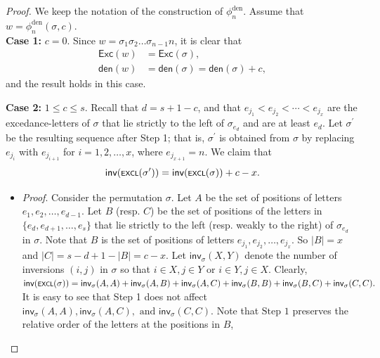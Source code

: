 \documentclass[12pt]{article}
\begin{document}
\begin{proof} 
We keep the notation of the construction of $\phi_{n}^{\text{den}}$.
Assume that $w=\phi_{n}^{\text{den}}(\sigma,c)$. 
\\
\noindent \textbf{Case 1:} $c=0$. 
Since $w=\sigma_{1}\sigma_{2}\ldots\sigma_{n-1}n$,
it is clear that 
\begin{align*}
\textsf{Exc}(w)&=\textsf{Exc}(\sigma), \\
\textsf{den}(w)&=\textsf{den}(\sigma)=\textsf{den}(\sigma)+c,
\end{align*}
and the result holds in this case.

\noindent\textbf{Case 2:} $1\leq c\leq s$. 	
Recall that $d=s+1-c$, 
and that $e_{j_{1}}<e_{j_{2}}<\cdots<e_{j_{x}}$ are the excedance-letters of $\sigma$ that lie strictly to the left of $\sigma_{e_{d}}$  and are at least $e_{d}$.
Let $\sigma^{\prime}$ be the resulting sequence after Step 1;
that is, $\sigma^{\prime}$ is obtained from $\sigma$ by replacing $e_{j_{i}}$ with $e_{j_{i+1}}$ for $i=1,2,\ldots,x$, where $e_{j_{x+1}}=n$.
We claim that
\vspace{-6pt}
\begin{equation}\label{eq-Excl-increase}
\textsf{inv}(\textsf{\scriptsize{EXCL}}(\sigma^{\prime}))=\textsf{inv}(\textsf{\scriptsize{EXCL}}(\sigma))+ c-x.
\vspace{-6pt}
\end{equation}
\begin{itemize}[leftmargin=1.6em]
	\item[]\emph{Proof}. 
	Consider the permutation $\sigma$.
	Let $A$ be the set of positions of letters $e_{1},e_{2},\ldots,e_{d-1}$.
	Let $B$ (resp. $C$) be the set of positions of the letters in $\{e_{d},e_{d+1},\ldots,e_{s}\}$ that lie strictly to the left (resp. weakly to the right) of $\sigma_{e_{d}}$ in $\sigma$.
	Note that $B$ is the set of positions of letters $e_{j_{1}},e_{j_{2}},\ldots,e_{j_{x}}$.
	So $|B|=x$ and $|C|=s-d+1-|B|=c-x$.
	Let $\textsf{inv}_{\sigma}(X,Y)$ denote the number of inversions $(i,j)$ in $\sigma$ so that $i\in X, j\in Y$ or $i\in Y,j\in X$.
	Clearly,
	$\textsf{inv}(\textsf{\scriptsize{EXCL}}(\sigma))=\textsf{inv}_{\sigma}(A,A)+\textsf{inv}_{\sigma}(A,B)+\textsf{inv}_{\sigma}(A,C)+\textsf{inv}_{\sigma}(B,B)+\textsf{inv}_{\sigma}(B,C)+\textsf{inv}_{\sigma}(C,C).$
	It is easy to see that Step 1 does not affect $\textsf{inv}_{\sigma}(A,A),\textsf{inv}_{\sigma}(A,C),\text{~and~}\textsf{inv}_{\sigma}(C,C)$.
	Note that $\text{Step 1}$ preserves the relative order of the letters at the positions in $B$,

\end{itemize}
\end{proof}
\end{document}
